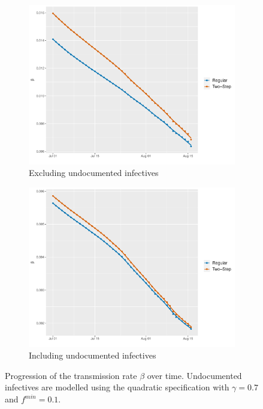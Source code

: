 \documentclass[12pt]{article}
\begin{document}
\begin{appendices}
		\begin{figure}[H]
    	    \centering
    	    \begin{subfigure}{0.495\textwidth}
    	      \centering
    	      \includegraphics[width=\linewidth]{output/panel_data_lag14_betas_rolling.pdf}
    	      \caption{Excluding undocumented infectives}
    	      \label{fig:beta_over_time_panel_data_rolling}
    	    \end{subfigure}
    	    \begin{subfigure}{0.495\textwidth}
    	      \centering
    	      \includegraphics[width=\linewidth]{output/panel_data_lag14_betas_UndocQuadratic_rolling.pdf}
    	      \caption{Including undocumented infectives}
    	      \label{fig:beta_over_time_panel_data_undoc_rolling}
    	    \end{subfigure}
    	    \caption{Progression of the transmission rate $\beta$ over time. Undocumented infectives are modelled using the quadratic specification with $\gamma = 0.7$ and $f^{min}=0.1$.}
    	    \label{fig:beta_over_time_panel_data_all}
    	\end{figure}
		

\end{appendices}
\end{document}
